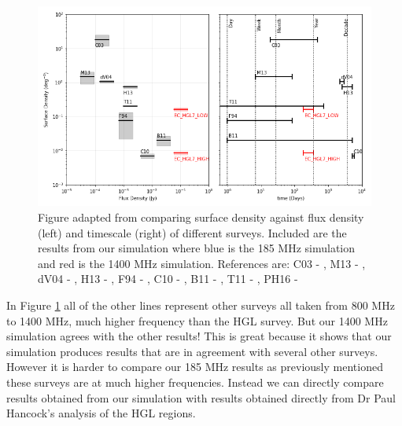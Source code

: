 \documentclass[a4paper]{article}
\begin{document}
\begin{figure}[H]
\begin{center}
  \includegraphics[width=\textwidth]{lognlogs2.png}
  \caption{Figure adapted from \citet{PDS_PJH} comparing surface density against flux density (left) and timescale (right) of different surveys. Included are the results from our simulation where blue is the 185 MHz simulation and red is the 1400 MHz simulation.  References are: C03 - \citet{Carilli03}, M13 - \citet{Mooley13}, dV04 - \citet{deVires04}, H13 - \citet{Hodge13}, F94 - \citet{Frail94}, C10 - \citet{Croft10}, B11 - \citet{Bannister11}, T11 - \citet{Thyag11}, PH16 - \citet{PDS_PJH}}
  \label{fig:comp}
\end{center}
\end{figure}
In Figure \ref{fig:comp} all of the other lines represent other surveys all taken from 800 MHz to 1400 MHz, much higher frequency than the HGL survey. But our 1400 MHz simulation agrees with the other results! This is great because it shows that our simulation produces results that are in agreement with several other surveys. However it is harder to compare our 185 MHz results as previously mentioned these surveys are at much higher frequencies. Instead we can directly compare results obtained from our simulation with results obtained directly from Dr Paul Hancock's analysis of the HGL regions.\\
\end{document}
